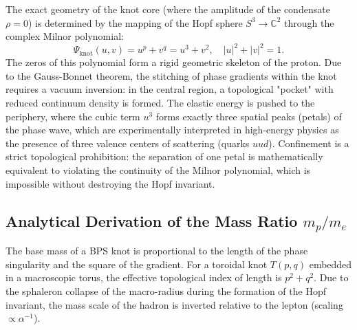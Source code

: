 \documentclass[11pt,a4paper]{article}
\begin{document}
The exact geometry of the knot core (where the amplitude of the condensate $\rho = 0$) is determined by the mapping of the Hopf sphere $S^3 \to \mathbb{C}^2$ through the complex Milnor polynomial:
\begin{equation}
\Psi_{\text{knot}}(u, v) = u^p + v^q = u^3 + v^2, \quad |u|^2 + |v|^2 = 1.
\end{equation}
The zeros of this polynomial form a rigid geometric skeleton of the proton. Due to the Gauss-Bonnet theorem, the stitching of phase gradients within the knot requires a vacuum inversion: in the central region, a topological "pocket" with reduced continuum density is formed. The elastic energy is pushed to the periphery, where the cubic term $u^3$ forms exactly three spatial peaks (petals) of the phase wave, which are experimentally interpreted in high-energy physics as the presence of three valence centers of scattering (quarks $uud$). Confinement is a strict topological prohibition: the separation of one petal is mathematically equivalent to violating the continuity of the Milnor polynomial, which is impossible without destroying the Hopf invariant.

\subsection{Analytical Derivation of the Mass Ratio $m_p/m_e$}
The base mass of a BPS knot is proportional to the length of the phase singularity and the square of the gradient. For a toroidal knot $T(p,q)$ embedded in a macroscopic torus, the effective topological index of length is $p^2 + q^2$. Due to the sphaleron collapse of the macro-radius during the formation of the Hopf invariant, the mass scale of the hadron is inverted relative to the lepton (scaling $\propto \alpha^{-1}$).
\end{document}
